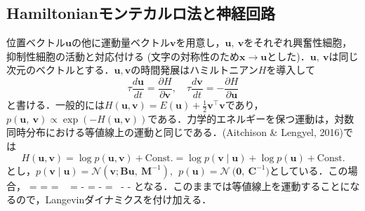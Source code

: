 \subsection{Hamiltonianモンテカルロ法と神経回路}
位置ベクトル$\mathbf{u}$の他に運動量ベクトル$\mathbf{v}$を用意し，$\mathbf{u}\mathbf{,\ }\mathbf{v}$をそれぞれ興奮性細胞，抑制性細胞の活動と対応付ける (文字の対称性のため$\mathbf{x}\to \mathbf{u}$とした)．$\mathbf{u,\ v}$は同じ次元のベクトルとする．$\mathbf{u}, \mathbf{v}$の時間発展はハミルトニアン$H$を導入して
\begin{equation}
\tau\frac{d\mathbf{u}}{dt} = \frac{\partial H}{\partial\mathbf{v}},\quad\tau\frac{d\mathbf{v}}{dt} = - \frac{\partial H}{\partial\mathbf{u}}
\end{equation}
と書ける．一般的には$H(\mathbf{u}, \mathbf{v}) = E\left( \mathbf{u} \right) + \frac{1}{2}\mathbf{v}^{\top}\mathbf{v}$であり，$p\left( \mathbf{u},\ \mathbf{v} \right) \propto \exp( - H(\mathbf{u,v}))$である．力学的エネルギーを保つ運動は，対数同時分布における等値線上の運動と同じである．(Aitchison & Lengyel, 2016)では
\begin{equation}
H(\mathbf{u}, \mathbf{v}) = \log p \left(\mathbf{u}, \mathbf{v} \right) + \textrm{Const.} = \log p \left(\mathbf{v} \middle| \mathbf{u} \right) + \log p\left(\mathbf{u} \right) + \textrm{Const.}
\end{equation}
とし，$p\left( \mathbf{v} \middle| \mathbf{u} \right)\mathcal{= N}\left( \mathbf{v};\mathbf{Bu},\ \mathbf{M}^{- 1} \right),\ \ p\left( \mathbf{u} \right) = \mathcal{N\ (}\mathbf{0},\ \mathbf{C}^{- 1})$としている．この場合，
{ =  =  = \ 
}{ = -  = -  = \  -  - 
}となる．このままでは等値線上を運動することになるので，Langevinダイナミクスを付け加える．

